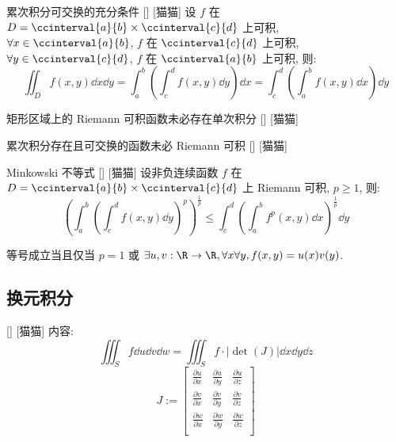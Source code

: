 \documentclass[UTF8]{ctexart}
\begin{document}
			\begin{crl}
			    []
			    {累次积分可交换的充分条件}
			    []
			    [猫猫]
				设 \(f\) 在 \(D=\ccinterval{a}{b}\times\ccinterval{c}{d}\) 上可积, \(\forall x\in\ccinterval{a}{b}\), \(f\) 在 \(\ccinterval{c}{d}\) 上可积, \(\forall y\in\ccinterval{c}{d}\), \(f\) 在 \(\ccinterval{a}{b}\) 上可积, 则: 
				\[\iint_{D}f(x,y)\dd x\dd y=\int_{a}^{b}\left(\int_{c}^{d}f(x,y)\dd y\right)\dd x=\int_{c}^{d}\left(\int_{a}^{b}f(x,y)\dd x\right)\dd y\]
			\end{crl}

			\begin{cxmp}
			    []
			    {矩形区域上的 Riemann 可积函数未必存在单次积分}
			    []
			    [猫猫]
			\end{cxmp}

			\begin{cxmp}
			    []
			    {累次积分存在且可交换的函数未必 Riemann 可积}
			    []
			    [猫猫]
			\end{cxmp}

			\begin{thm}
			    []
			    {Minkowski 不等式}
			    []
			    [猫猫]
				设非负连续函数 \(f\) 在 \(D=\ccinterval{a}{b}\times\ccinterval{c}{d}\) 上 Riemann 可积, \(p\geq 1\), 则: 
				\[{\left(\int_a^b{\left(\int_c^d f(x,y)\dd y\right)}^p\right)}^{\frac{1}{p}}
				\leq
				\int_c^d{\left(\int_a^b f^p(x,y)\dd x\right)}^{\frac{1}{p}}\dd y\]

				等号成立当且仅当 \(p=1\) 或 \(\exists u,v:\R\to\R, \forall x\forall y, f(x,y)=u(x)v(y)\). 
			\end{thm}

		\subsection{换元积分}
			
			\begin{thm}
				[]
				{}
				[]
				[猫猫]
				内容: 
				\[\iiint_S f \dd u\dd v\dd w=\iiint_S f\cdot|\det(J)|\dd x\dd y\dd z\]
				\[J:=
				\begin{bmatrix}
					\frac{\partial u}{\partial x} & \frac{\partial u}{\partial y} & \frac{\partial u}{\partial z}\\
					\frac{\partial v}{\partial x} & \frac{\partial v}{\partial y} & \frac{\partial v}{\partial z}\\
					\frac{\partial w}{\partial x} & \frac{\partial w}{\partial y} & \frac{\partial w}{\partial z}\\
				\end{bmatrix}\]
			\end{thm}
		
\end{document}
